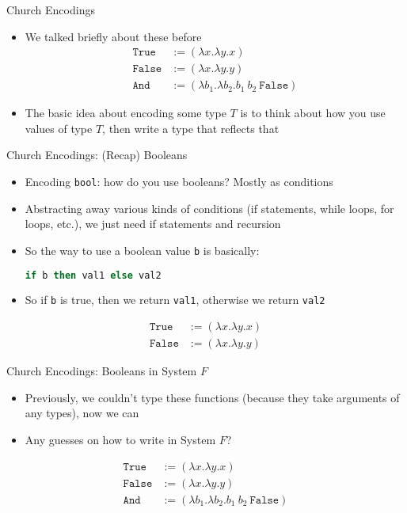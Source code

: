 \documentclass[leqno,presentation,usenames,dvipsnames]{beamer}
\begin{document}
\begin{frame}[fragile]{Church Encodings}
    \begin{itemize}
        \item We talked briefly about these before
\begin{align*}
    \texttt{True} & := (\lambda x. \lambda y. x) \\
    \texttt{False} & := (\lambda x. \lambda y. y) \\
    \texttt{And} & := (\lambda b_1. \lambda b_2. b_1~b_2~\texttt{False})
\end{align*}
        \item The basic idea about encoding some type $T$ is to think about how you use values of type $T$, then write a type that reflects that
    \end{itemize}
\end{frame}

\begin{frame}[fragile]{Church Encodings: (Recap) Booleans}
    \begin{itemize}
        \item Encoding \texttt{bool}: how do you use booleans? Mostly as conditions
        \item Abstracting away various kinds of conditions (if statements, while loops, for loops, etc.), we just need if statements and recursion
        \item So the way to use a boolean value \texttt{b} is basically:
\begin{lstlisting}[language=haskell, basicstyle=\small\ttfamily]
if b then val1 else val2
\end{lstlisting}
        \item So if \texttt{b} is true, then we return \texttt{val1}, otherwise we return \texttt{val2}
    \end{itemize}
\begin{align*}
    \texttt{True} & := (\lambda x. \lambda y. x) \\
    \texttt{False} & := (\lambda x. \lambda y. y)
\end{align*}
\end{frame}

\begin{frame}[fragile]{Church Encodings: Booleans in System $F$}
    \begin{itemize}
        \item Previously, we couldn't type these functions (because they take arguments of any types), now we can
        \item Any guesses on how to write in System $F$?
    \end{itemize}
\begin{align*}
    \texttt{True} & := (\lambda x. \lambda y. x) \\
    \texttt{False} & := (\lambda x. \lambda y. y) \\
    \texttt{And} & := (\lambda b_1. \lambda b_2. b_1~b_2~\texttt{False})
\end{align*}
\end{frame}
\end{document}
